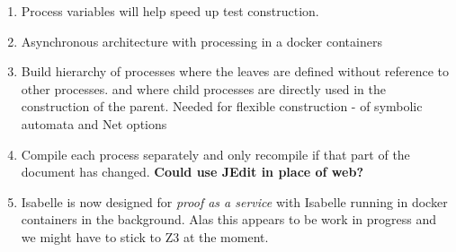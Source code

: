 \documentclass[]{article}
\begin{document}
\begin{enumerate}
\item Process variables will help speed up test construction.
\item Asynchronous architecture with  processing  in a docker containers 
\item {\sf Build hierarchy of processes }   where the leaves are defined without reference to other processes. and where child processes are directly used in the construction of the parent. 
 Needed for flexible construction - of  symbolic automata and Net options
\item Compile each process separately  and only recompile if that part of the document has changed. {\bf Could use JEdit  in place of web?} 

\item  Isabelle  is now designed for \emph{proof as a service}  with Isabelle running in docker containers in the background.  Alas this appears to be work in progress and we might have to stick to Z3 at the moment.
\end{enumerate}
 
\end{document}
